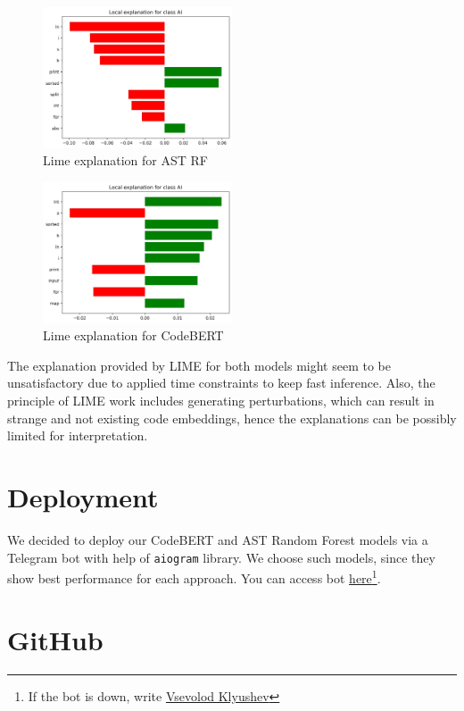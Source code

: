 \documentclass{article}
\begin{document}
\begin{figure}[H]
  \centering
  \includegraphics[width=0.5\textwidth]{./pictures/ast_lime.jpg}
  \caption{Lime explanation for AST RF}\label{fig:LIME_AST}
\end{figure}

\begin{figure}[H]
  \centering
  \includegraphics[width=0.5\textwidth]{./pictures/codebert_lime.jpg}
  \caption{Lime explanation for CodeBERT}\label{fig:LIME_CodeBERT}
\end{figure}

The explanation provided by LIME for both models might seem to be unsatisfactory due to applied time constraints to keep fast inference. Also, the principle of LIME work includes generating perturbations, which can result in strange and not existing code embeddings, hence the explanations can be possibly limited for interpretation.

\section{Deployment}

We decided to deploy our CodeBERT and AST Random Forest models via a Telegram bot with help of \texttt{aiogram} library. We choose such models, since they show best performance for each approach. You can access bot \href{https://t.me/ui_ai_detector_bot}{here}\footnote{If the bot is down, write \href{https://t.me/Kiaver}{Vsevolod Klyushev}}.

\section{GitHub}
\end{document}
